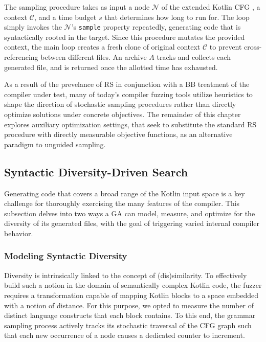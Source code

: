 The sampling procedure takes as input a node $\mathcal{N}$ of the extended Kotlin \gls{CFG}
, a context $\mathcal{C}$, 
and a time budget $s$ that determines how long to run for.
The loop simply invokes the $\mathcal{N}$'s \texttt{sample} property repeatedly,
generating code that is syntactically rooted in the target.
Since this procedure mutates the provided context, the main loop creates a fresh
clone of original context $\mathcal{C}$ to prevent cross-referencing between
different files.
An archive $A$ tracks and collects each generated file,
and is returned once the allotted time has exhausted.

As a result of the prevelance of \gls{RS} in conjunction with a \gls{BB} treatment of
the compiler under test, many of today's compiler fuzzing tools utilize heuristics to shape
the direction of stochastic sampling procedures rather than directly
optimize solutions under concrete objectives.
The remainder of this chapter explores auxiliary optimization settings,
that seek to substitute the standard \gls{RS} procedure
with directly measurable objective functions, as an alternative
paradigm to unguided sampling.

\subsection{\label{subsec:diversity-ga}Syntactic Diversity-Driven Search}

Generating code that covers a broad range of the Kotlin
input space is a key challenge for thoroughly exercising the many features
of the compiler.
This subsection delves into two ways a \gls{GA} can model, measure,
and optimize for the diversity of its generated files, with the goal
of triggering varied internal compiler behavior.

\subsubsection{\label{subsec:model-div} Modeling Syntactic Diversity} Diversity is intrinsically linked to the
concept of (dis)similarity.
To effectively build such a notion in the domain of semantically
complex Kotlin code, the fuzzer requires a transformation capable
of mapping Kotlin blocks to a space embedded with
a notion of distance.
For this purpose, we opted to measure the number of distinct
language constructs that each block contains.
To this end, the grammar sampling process actively tracks
its stochastic traversal of the \gls{CFG} graph such that
each new occurrence of a node causes a dedicated counter to increment.

